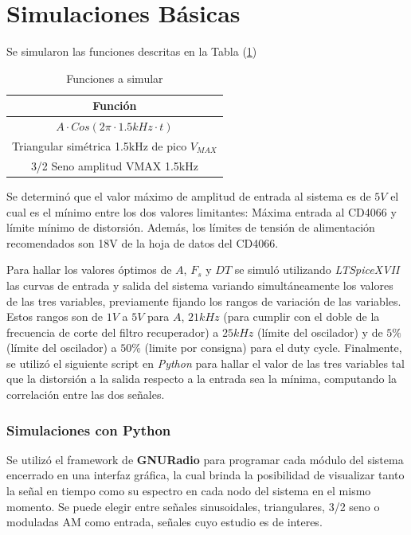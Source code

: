 


\section{Simulaciones Básicas}

Se simularon las funciones descritas en la Tabla (\ref{fn})

\begin{table}[H]
\centering
\begin{tabular}{@{}c@{}}
\toprule
Función \\ \midrule
$A\cdot Cos(2\pi \cdot 1.5kHz \cdot t)$ \\
Triangular simétrica 1.5kHz de pico $V_{MAX}$ \\
3/2 Seno amplitud VMAX 1.5kHz \\ \bottomrule
\end{tabular}
\caption{Funciones a simular}
\label{fn}
\end{table}

Se determinó que el valor máximo de amplitud de entrada al sistema es de $5V$ el cual es el mínimo entre los dos valores limitantes: Máxima entrada al CD4066 y límite mínimo de distorsión. Además, los límites de tensión de alimentación recomendados son 18V de la hoja de datos del CD4066.

Para hallar los valores óptimos de $A$, $F_s$ y $DT$ se simuló utilizando \textit{LTSpiceXVII} las curvas de entrada y salida del sistema variando simultáneamente los valores de las tres variables, previamente fijando los rangos de variación de las variables. Estos rangos son de $1V$ a $5V$ para $A$,
 $21kHz$ (para cumplir con el doble de la frecuencia de corte del filtro recuperador) a $25kHz$ (límite del oscilador) y de $5\%$ (límite del oscilador) a $50\%$ (limite por consigna) para el duty cycle. Finalmente, se utilizó el siguiente script en \textit{Python} para hallar el valor de las tres variables tal que la distorsión a la salida respecto a la entrada sea la mínima, computando la correlación entre las dos señales.





\subsubsection{Simulaciones con Python}
Se utilizó el framework de \textbf{GNURadio} para programar cada módulo del sistema encerrado en una interfaz gráfica, la cual brinda la posibilidad de visualizar tanto la señal en tiempo como su espectro en cada nodo del sistema en el mismo momento. Se puede elegir entre señales sinusoidales, triangulares, 3/2 seno o moduladas AM como entrada, señales cuyo estudio es de interes.

